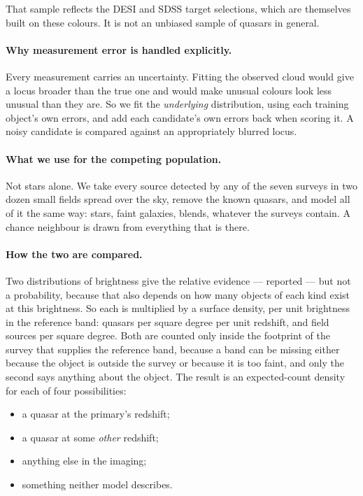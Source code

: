 \documentclass[11pt,a4paper]{article}
\begin{document}
That sample reflects the DESI and SDSS target selections, which are themselves
built on these colours. It is not an unbiased sample of quasars in general.

\paragraph{Why measurement error is handled explicitly.} Every measurement
carries an uncertainty. Fitting the observed cloud would give a locus broader
than the true one and would make unusual colours look less unusual than they
are. So we fit the \emph{underlying} distribution, using each training object's
own errors, and add each candidate's own errors back when scoring it. A noisy
candidate is compared against an appropriately blurred locus.

\paragraph{What we use for the competing population.} Not stars alone. We take
every source detected by any of the seven surveys in two dozen small fields
spread over the sky, remove the known quasars, and model all of it the same way:
stars, faint galaxies, blends, whatever the surveys contain. A chance neighbour
is drawn from everything that is there.

\paragraph{How the two are compared.} Two distributions of brightness give the
relative evidence --- reported --- but not a probability, because that also
depends on how many objects of each kind exist at this brightness. So each is
multiplied by a surface density, per unit brightness in the reference band:
quasars per square degree per unit redshift, and field sources per square degree.
Both are counted only inside the footprint of the survey that supplies the
reference band, because a band can be missing either because the object is
outside the survey or because it is too faint, and only the second says
anything about the object. The result is an expected-count density for each of
four possibilities:

\begin{itemize}
\item a quasar at the primary's redshift;
\item a quasar at some \emph{other} redshift;
\item anything else in the imaging;
\item something neither model describes.
\end{itemize}
\end{document}
